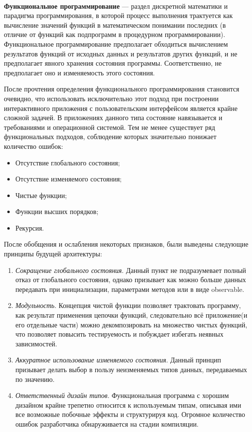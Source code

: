 \paragraph{}
\textbf{Функциональное программирование} --- раздел дискретной математики и парадигма программирования, в которой процесс выполнения трактуется как вычисление значений функций в математическом понимании последних (в отличие от функций как подпрограмм в процедурном программировании). Функциональное программирование предполагает обходиться вычислением результатов функций от исходных данных и результатов других функций, и не предполагает явного хранения состояния программы. Соответственно, не предполагает оно и изменяемость этого состояния. \cite{wiki:fp}

После прочтения определения функционального программирования становится очевидно, что использовать исключительно этот подход при построении интерактивного приложения с пользовательским интерфейсом является крайне сложной задачей. В приложениях данного типа состояние навязывается и требованиями и операционной системой. Тем не менее существует ряд функциональных подходов, соблюдение которых значительно понижает количество ошибок:

\begin{itemize}
\item Отсутствие глобального состояния;
\item Отсутствие изменяемого состояния;
\item Чистые функции;
\item Функции высших порядков;
\item Рекурсия.
\end{itemize}

После обобщения и ослабления некоторых признаков, были выведены следующие принципы будущей архитектуры:

\begin{enumerate}
\item \textit{Сокращение глобального состояния}. Данный пункт не подразумевает полный отказ от глобального состояния, однако призывает как можно больше данных передавать при инициализации, параметрами методов или в виде \gls{observable}.
\item \textit{Модульность}. Концепция чистой функции позволяет трактовать программу, как результат применения цепочки функций, следовательно всё приложение(и его отдельные части) можно декомпозировать на множество чистых функций, что позволяет повысить тестируемость и побуждает избегать неявных зависимостей.
\item \textit {Аккуратное использование изменяемого состояния}. Данный принцип призывает делать выбор в пользу неизменяемых типов данных, передаваемых по значению. 
\item \textit {Ответственный дизайн типов}. Функциональная программа с хорошим дизайном крайне трепетно относится к используемым типам, описывая ими все возможные побочные эффекты и структурируя код. Огромное количество ошибок разработчика обнаруживается на стадии компиляции.
\end{enumerate}

